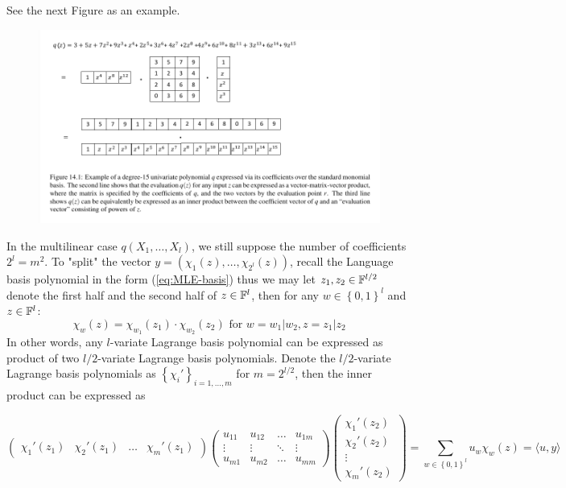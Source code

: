 \documentclass{article}
\begin{document}
See the next Figure as an example.

\begin{figure}[h]
\centering
\includegraphics[scale=0.4]{eval-poly-1}
\end{figure} 

In the multilinear case $q(X_1, \dots, X_l)$, we still suppose the number of coefficients $2^l = m^2$. To "split" the vector $y = (\chi_1(z), \dots, \chi_{2^l}(z))$, recall the Language basis polynomial in the form (\ref{eq:MLE-basis}) thus we may let $z_1, z_2 \in \mathbb{F}^{l/2}$ denote the first half and the second half of $z \in \mathbb{F}^l$, then for any $w \in \left\{ 0, 1 \right\}^l$ and $z \in \mathbb{F}^{l}$:
\begin{equation*}
\chi_w (z) = \chi_{w_1}(z_1) \cdot \chi_{w_2}(z_2) \text{ for } w = w_1 \vert w_2, z = z_1 \vert z_2
\end{equation*}
In other words, any $l$-variate Lagrange basis polynomial can be expressed as product of two $l/2$-variate Lagrange basis polynomials. Denote the $l/2$-variate Lagrange basis polynomials as $\left\{ \chi_i' \right\}_{i = 1, \dots, m}$ for $m = 2^{l/2}$, then the inner product can be expressed as 

\begin{equation*}
\begin{pmatrix}
\chi_1'(z_1) & \chi_2'(z_1) & \dots & \chi_m'(z_1)
\end{pmatrix}
\begin{pmatrix}
u_{11}  & u_{12}   & \dots  & u_{1m} \\
\vdots & \vdots  & \ddots & \vdots \\
u_{m1}  & u_{m2}  &\dots     & u_{mm}
\end{pmatrix}
\begin{pmatrix}
\chi_1'(z_2) \\
\chi_2'(z_2) \\
\vdots \\
\chi_m'(z_2)
\end{pmatrix}
= \sum_{w \in \left\{ 0, 1 \right\}^l}  u_{w} \chi_{w}(z) = \langle u, y \rangle
\end{equation*}  
\end{document}
